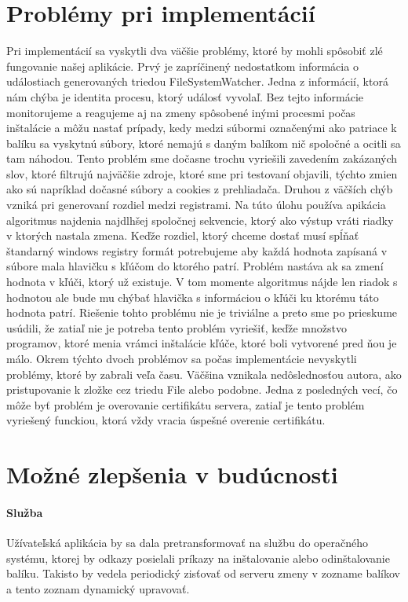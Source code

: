\section{Problémy pri implementácií}
Pri implementácií sa vyskytli dva väčšie problémy, ktoré by mohli spôsobiť zlé fungovanie našej aplikácie. Prvý je zapríčinený nedostatkom informácia o událostiach generovaných triedou FileSystemWatcher. Jedna z informácií, ktorá nám chýba je identita procesu, ktorý událosť vyvolaľ. Bez tejto informácie monitorujeme a reagujeme aj na zmeny spôsobené inými procesmi počas inštalácie a môžu nastať prípady, kedy medzi súbormi označenými ako patriace k balíku sa vyskytnú súbory, ktoré nemajú s daným balíkom nič spoločné a ocitli sa tam náhodou. Tento problém sme dočasne trochu vyriešili zavedením zakázaných slov, ktoré filtrujú najväčšie zdroje, ktoré sme pri testovaní objavili, týchto zmien ako sú napríklad dočasné súbory a cookies z prehliadača.
Druhou z väčších chýb vzniká pri generovaní rozdiel medzi registrami. Na túto úlohu používa apikácia algoritmus najdenia najdlhšej spoločnej sekvencie, ktorý ako výstup vráti riadky v ktorých nastala zmena. Keďže rozdiel, ktorý chceme dostať musí spĺňať štandarný windows registry formát potrebujeme aby každá hodnota zapísaná v súbore mala hlavičku s kľúčom do ktorého patrí. Problém nastáva ak sa zmení hodnota v kľúči, ktorý už existuje. V tom momente algoritmus nájde len riadok s hodnotou ale bude mu chýbať hlavička s informáciou o kľúči ku ktorému táto hodnota patrí. Riešenie tohto problému nie je triviálne a preto sme po prieskume usúdili, že zatiaľ nie je potreba tento problém vyriešiť, keďže množstvo programov, ktoré menia vrámci inštalácie kľúče, ktoré boli vytvorené pred ňou je málo. Okrem týchto dvoch problémov sa počas implementácie nevyskytli problémy, ktoré by zabrali veľa času. Väčšina vznikala nedôslednosťou autora, ako pristupovanie k zložke cez triedu File alebo podobne.
Jedna z posledných vecí, čo môže byť problém je overovanie certifikátu servera, zatiaľ je tento problém vyriešený funckiou, ktorá vždy vracia úspešné overenie certifikátu.

\section{Možné zlepšenia v budúcnosti}
\paragraph{Služba}
Užívateľská aplikácia by sa dala pretransformovať na službu do operačného systému, ktorej by odkazy posielali príkazy na inštalovanie alebo odinštalovanie balíku. Takisto by vedela periodický zisťovať od serveru zmeny v zozname balíkov a tento zoznam dynamický upravovať.

